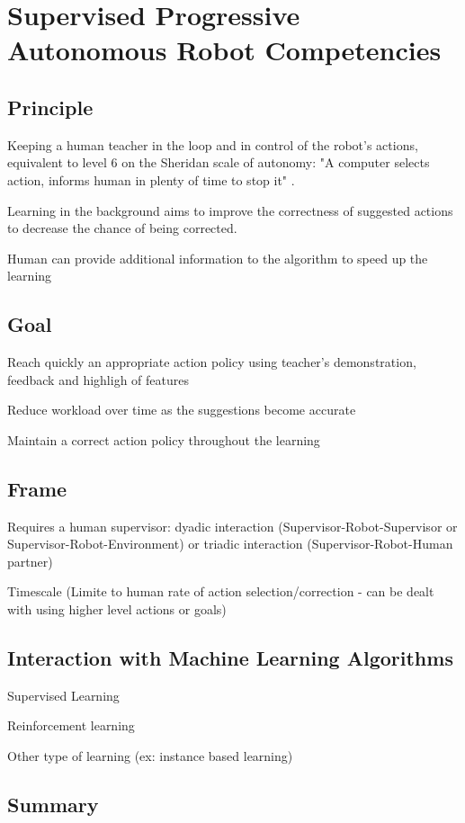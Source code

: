 \chapter{Supervised Progressive Autonomous Robot Competencies}\label{chap:sparc}

\section{Principle}

\cite{senft2015sparc}

Keeping a human teacher in the loop and in control of the robot's actions,
equivalent to level 6 on the Sheridan scale of autonomy: "A computer selects
action, informs human in plenty of time to stop it" \cite{sheridan1978human}.

Learning in the background aims to improve the correctness of suggested actions
to decrease the chance of being corrected.

Human can provide additional information to the algorithm to speed up the
learning

\section{Goal}

Reach quickly an appropriate action policy using teacher's demonstration,
feedback and highligh of features

Reduce workload over time as the suggestions become accurate

Maintain a correct action policy throughout the learning

\section{Frame}

Requires a human supervisor: dyadic interaction (Supervisor-Robot-Supervisor or
Supervisor-Robot-Environment) or triadic interaction (Supervisor-Robot-Human
partner)

Timescale (Limite to human rate of action selection/correction - can be dealt
with using higher level actions or goals)

\section{Interaction with Machine Learning Algorithms}

Supervised Learning

Reinforcement learning 

Other type of learning (ex: instance based learning)

\section{Summary}
    
    

